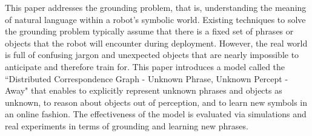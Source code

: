 This paper addresses the grounding problem, that is, understanding the meaning of natural language within a robot's symbolic world. Existing techniques to solve the grounding problem typically assume that there is a fixed set of phrases or objects that the robot will encounter during deployment. However, the real world is full of confusing jargon and unexpected objects that are nearly impossible to anticipate and therefore train for. This paper introduces a model called the ``Distributed Correspondence Graph - Unknown Phrase, Unknown Percept - Away" that enables to explicitly represent unknown phrases and objects as unknown, to reason about objects out of perception, and to learn new symbols in an online fashion. The effectiveness of the model is evaluated via simulations and real experiments in terms of grounding and learning new phrases.



